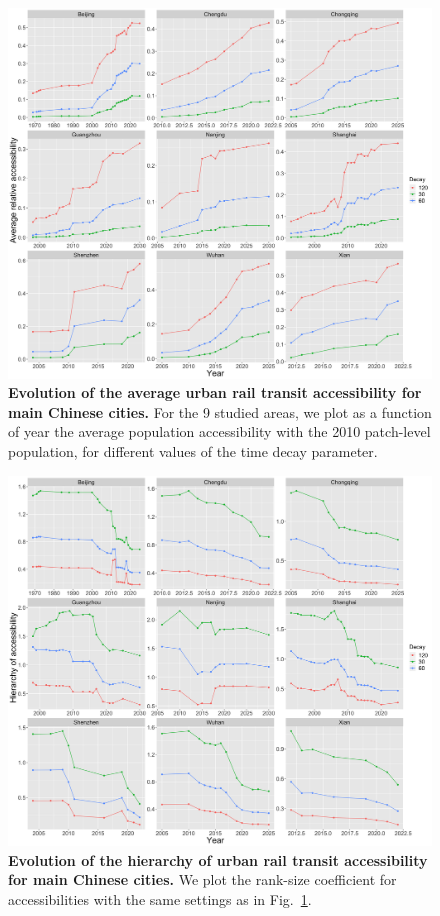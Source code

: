 \documentclass[11pt]{article}
\begin{document}
\begin{figure}
	\includegraphics[width=\textwidth]{avgaccess_facet.png}
	\caption{\textbf{Evolution of the average urban rail transit accessibility for main Chinese cities.} For the 9 studied areas, we plot as a function of year the average population accessibility with the 2010 patch-level population, for different values of the time decay parameter.\label{fig:tcaccessavg}}
\end{figure}


\begin{figure}
	\includegraphics[width=\textwidth]{accesshierarchy_facet.png}
	\caption{\textbf{Evolution of the hierarchy of urban rail transit accessibility for main Chinese cities.} We plot the rank-size coefficient for accessibilities with the same settings as in Fig.~\ref{fig:tcaccessavg}.\label{fig:tcaccesshierarchy}}
\end{figure}
\end{document}
